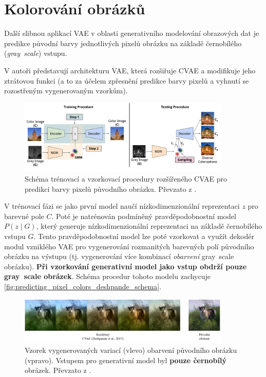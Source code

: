 \newpage
\section{Kolorování obrázků}
\label{sec:applications_image_coloring}
Další slibnou aplikací VAE v oblasti generativního modelování obrazových dat je predikce původní barvy jednotlivých pixelů obrázku na základě černobílého (\emph{gray~scale}) vstupu.

V \textcite{Deshpande2017} autoři představují architekturu VAE, která rozšiřuje CVAE a modifikuje jeho ztrátovou funkci (a to za účelem zpřesnění predikce barvy pixelů a vyhnutí se rozostřeným vygenerovaným vzorkům).
\begin{figure}[H]
    \centering
    \includegraphics[width=0.9\textwidth]{figures/applications/predicting_pixel_colors_deshpande_vae_schema.png}
    \caption{Schéma trénovací a vzorkovací procedury rozšířeného CVAE pro predikci barvy pixelů původního obrázku. Převzato z \textcite{Deshpande2017}.}
    \label{fig:predicting_pixel_colors_deshpande_schema}
\end{figure}

V trénovací fázi se jako první model naučí nízkodimenzionální reprezentaci $z$ pro barevné pole $C$.
Poté je natrénován podmíněný pravděpodobnostní model $P(z \mid G)$, který generuje nízkodimenzionální reprezentaci na základě černobílého vstupu $G$. 
Tento pravděpodobnostní model lze poté vzorkovat a využít dekodér modul vzniklého VAE pro vygenerování rozmanitých barevných polí původního obrázku na výstupu (tj. vygenerování více kombinací \emph{obarvení} gray~scale obrázku).
\textbf{Při vzorkování generativní model jako vstup obdrží pouze gray~scale obrázek}. Schéma procedur tohoto modelu zachycuje \autoref{fig:predicting_pixel_colors_deshpande_schema}. \cite{Deshpande2017}

\begin{figure}[H]
    \centering
    \includegraphics[width=0.9\textwidth]{figures/applications/predicting_pixel_colors_deshpande.pdf}
    \caption{Vzorek vygenerovaných variací (vlevo) obarvení původního obrázku (vpravo). Vstupem pro generativní model byl \textbf{pouze černobílý} obrázek. Převzato z \textcite{Deshpande2017}.}
    \label{fig:predicting_pixel_colors_deshpande}
\end{figure}

